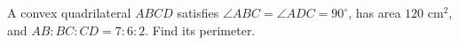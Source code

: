 A convex quadrilateral $ABCD$ satisfies $\angle ABC=\angle ADC=90^\circ$, has area $120\text{ cm}^2$, and $AB:BC:CD=7:6:2$. Find its perimeter.
